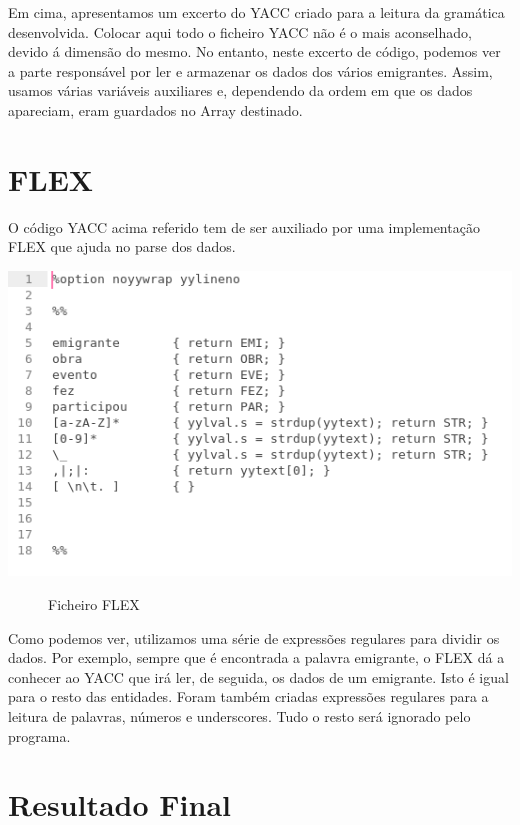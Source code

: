\documentclass[a4paper]{article}
\begin{document}
Em cima, apresentamos um excerto do YACC criado para a leitura da gramática desenvolvida. Colocar aqui todo o ficheiro YACC não é o mais aconselhado, devido á dimensão do mesmo.
No entanto, neste excerto de código, podemos ver a parte responsável por ler e armazenar os dados dos vários emigrantes. Assim, usamos várias variáveis auxiliares e, dependendo da ordem em que os dados apareciam, eram guardados no Array destinado.

\vspace{500px}
\section{FLEX}
\label{sec:gawk}

O código YACC acima referido tem de ser auxiliado por uma implementação FLEX que ajuda no parse dos dados.

\begin{center}
	\includegraphics[scale=0.7]{flex}
	\begin{figure}[!ht]
	\caption{Ficheiro FLEX}
	\end{figure}
\end{center}

Como podemos ver, utilizamos uma série de expressões regulares para dividir os dados.
Por exemplo, sempre que é encontrada a palavra emigrante, o FLEX dá a conhecer ao YACC que irá ler, de seguida, os dados de um emigrante. Isto é igual para o resto das entidades.
Foram também criadas expressões regulares para a leitura de palavras, números e underscores. Tudo o resto será ignorado pelo  programa.

\vspace{200px}
\section{Resultado Final}
\label{sec:resfinal1}
\end{document}
